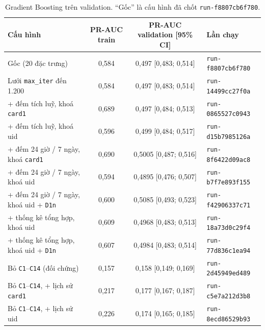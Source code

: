 \documentclass[11pt,a4paper]{article}
\newcommand{\code}[1]{\texttt{\small #1}}
\begin{document}
\begin{table}[H]\centering\small
\caption{Gradient Boosting trên validation. ``Gốc'' là cấu hình đã chốt \code{run-f8807cb6f780}.}
\begin{tabularx}{\linewidth}{@{}Xccl@{}}
\toprule
Cấu hình & PR-AUC train & PR-AUC validation [95\% CI] & Lần chạy \\ \midrule
Gốc (20 đặc trưng) & 0,584 & 0,497 [0,483; 0,514] & \code{run-f8807cb6f780} \\
Lưới \code{max\_iter} đến 1.200 & 0,584 & 0,497 [0,483; 0,514] & \code{run-14499cc27f0a} \\
+ đếm tích luỹ, khoá \code{card1} & 0,689 & 0,497 [0,484; 0,513] & \code{run-0865527c0943} \\
+ đếm tích luỹ, khoá uid & 0,596 & 0,499 [0,484; 0,517] & \code{run-d15b7985126a} \\
+ đếm 24 giờ / 7 ngày, khoá \code{card1} & 0,690 & 0,5005 [0,487; 0,516] & \code{run-8f6422d09ac8} \\
+ đếm 24 giờ / 7 ngày, khoá uid & 0,594 & 0,4895 [0,476; 0,507] & \code{run-b7f7e893f155} \\
+ đếm 24 giờ / 7 ngày, khoá uid + \code{D1n} & 0,600 & 0,5085 [0,493; 0,523] & \code{run-f42906337c71} \\
+ thống kê tổng hợp, khoá uid & 0,609 & 0,4968 [0,483; 0,513] & \code{run-18a73d0c29f4} \\
+ thống kê tổng hợp, khoá uid + \code{D1n} & 0,607 & 0,4984 [0,483; 0,514] & \code{run-77d836c1ea94} \\ \midrule
Bỏ \code{C1}--\code{C14} (đối chứng) & 0,157 & 0,158 [0,149; 0,169] & \code{run-2d45949ed489} \\
Bỏ \code{C1}--\code{C14}, + lịch sử \code{card1} & 0,217 & 0,177 [0,167; 0,187] & \code{run-c5e7a212d3b8} \\
Bỏ \code{C1}--\code{C14}, + lịch sử uid & 0,226 & 0,174 [0,165; 0,185] & \code{run-8ecd86529b93} \\ \bottomrule
\end{tabularx}
\end{table}
\end{document}
